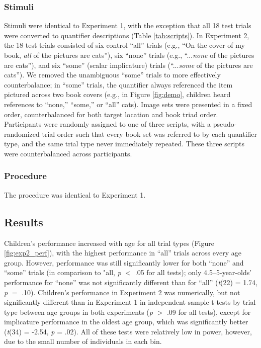 \documentclass[man]{apa2}
\begin{document}
\subsubsection{Stimuli}

Stimuli were identical to Experiment 1, with the exception that all 18 test trials were converted to quantifier descriptions (Table \ref{tab:scripts}). In Experiment 2, the 18 test trials consisted of six control ``all'' trials (e.g., ``On the cover of my book, \textit{all} of the pictures are cats''), six ``none'' trials (e.g., ``...\textit{none} of the pictures are cats''), and six ``some'' (scalar implicature) trials (``...\textit{some} of the pictures are cats''). We removed the unambiguous ``some'' trials to more effectively counterbalance; in ``some'' trials, the quantifier always referenced the item pictured across two book covers (e.g., in Figure \ref{fig:demo}, children heard references to ``none,'' ``some,'' or ``all'' cats). Image sets were presented in a fixed order, counterbalanced for both target location and book triad order. Participants were randomly assigned to one of three scripts, with a pseudo-randomized trial order such that every book set was referred to by each quantifier type, and the same trial type never immediately repeated. These three scripts were counterbalanced across participants.

\subsubsection{Procedure}
The procedure was identical to Experiment 1.

\subsection{Results}

Children's performance increased with age for all trial types (Figure \ref{fig:exp2_perf}), with the highest performance in ``all'' trials across every age group. However, performance was still significantly lower for both ``none'' and ``some'' trials (in comparison to "all, \emph{p} $<$ .05 for all tests); only 4.5--5-year-olds' performance for ``none'' was not significantly different than for ``all'' (\emph{t}(22) = 1.74, \emph{p} $=$ .10). Children's performance in Experiment 2 was numerically, but not significantly different than in Experiment 1 in independent sample t-tests by trial type between age groups in both experiments (\emph{p} $>$ .09 for all tests), except for implicature performance in the oldest age group, which was significantly better (\emph{t}(34) = -2.54, \emph{p} = .02). All of these tests were relatively low in power, however, due to the small number of individuals in each bin.
\end{document}
